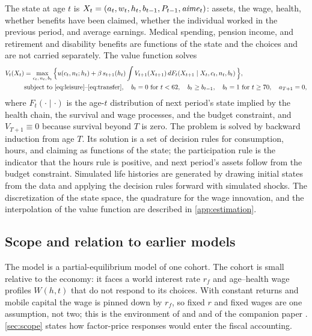 The state at age $t$ is $X_t=(a_t,w_t,h_t,b_{t-1},P_{t-1},\mathit{aime}_t)$: assets, the wage, health, whether benefits have been claimed, whether the individual worked in the previous period, and average earnings. %
Medical spending, pension income, and retirement and disability benefits are functions of the state and the choices and are not carried separately. %
The value function solves
\begin{equation}\label{eq:bellman}
\begin{aligned}
V_t(X_t)&=\max_{c_t,\,n_t,\,b_t}\Big\{u(c_t,n_t;h_t)+\beta\,s_{t+1}(h_t)\int V_{t+1}(X_{t+1})\,dF_t\!\left(X_{t+1}\mid X_t,c_t,n_t,b_t\right)\Big\},\\
&\text{subject to \eqref{eq:leisure}--\eqref{eq:transfer}},\quad b_t=0\ \text{for } t<62,\quad b_t\geq b_{t-1},\quad b_t=1\ \text{for } t\geq 70,\quad a_{T+1}=0,
\end{aligned}
\end{equation}
where $F_t(\cdot\mid\cdot)$ is the age-$t$ distribution of next period's state implied by the health chain, the survival and wage processes, and the budget constraint, and $V_{T+1}\equiv 0$ because survival beyond $T$ is zero. %
The problem is solved by backward induction from age $T$. %
Its solution is a set of decision rules for consumption, hours, and claiming as functions of the state; the participation rule is the indicator that the hours rule is positive, and next period's assets follow from the budget constraint. %
Simulated life histories are generated by drawing initial states from the data and applying the decision rules forward with simulated shocks. %
The discretization of the state space, the quadrature for the wage innovation, and the interpolation of the value function are described in \autoref{app:estimation}.

\subsection{Scope and relation to earlier models}\label{subsec:scope}

The model is a partial-equilibrium model of one cohort. The cohort is small relative to the economy: it faces a world interest rate $r_f$ and age--health wage profiles $W(h,t)$ that do not respond to its choices. With constant returns and mobile capital the wage is pinned down by $r_f$, so fixed $r$ and fixed wages are one assumption, not two; this is the environment of \citet{farhi2013insurance} and \citet{golosov2016redistribution} and of the companion paper \citep{ndiaye2026flexible}. \autoref{sec:scope} states how factor-price responses would enter the fiscal accounting.

